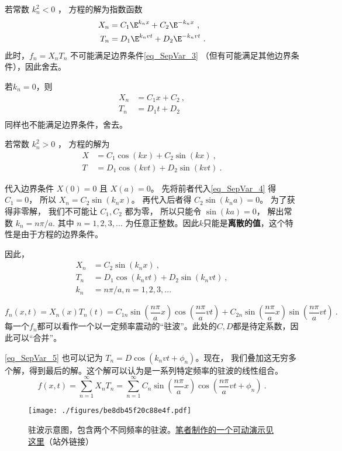 若常数 $k_n^2 < 0$ ， 方程的解为指数函数
\begin{align}
X_n &= C_1 \E^{k_nx} + C_2 \E^{-k_nx}~,\\
T_n &= D_1 \E^{k_nvt} + D_2 \E^{-k_nvt}~.
\end{align}
此时，$f_n = X_nT_n$ 不可能满足边界条件\autoref{eq_SepVar_3}  （但有可能满足其他边界条件），因此舍去。

若$k_n=0$，则
\begin{align}
X_n &= C_1x+C_2~,\\
T_n &= D_1t+D_2~\\
\end{align}
同样也不能满足边界条件，舍去。

若常数 $k_n^2 > 0$ ， 方程的解为
\begin{align}\label{eq_SepVar_4}
X &= C_1 \cos(kx) + C_2 \sin(kx)~,\\
T &= D_1 \cos(kvt) + D_2 \sin(kvt)~.
\end{align}

代入边界条件 $X(0) = 0$ 且 $X(a) = 0$。 先将前者代入\autoref{eq_SepVar_4} 得 $C_1 = 0$， 所以 $X_n = C_2\sin(k_nx)$。 再代入后者得 $C_2\sin(k_na) = 0$。 为了获得非零解， 我们不可能让 $C_1, C_2$ 都为零， 所以只能令 $\sin(ka) = 0$， 解出常数 $k_n = n\pi/a$. 其中 $n=1,2,3,...$ 为任意正整数。因此$k$只能是\textbf{离散的值}，这个特性是由于方程的边界条件。

因此，
\begin{align}
\label{eq_SepVar_5}X_n &= C_2 \sin(k_nx)~,\\
T_n &= D_1 \cos(k_nvt) + D_2 \sin(k_nvt)~,\\
k_n & = n\pi/a, n=1,2,3,...~
\end{align}

\begin{equation}
f_n(x, t) = X_n(x) T_n(t) = C_{1n} \sin(\frac{n\pi}{a}x)\cos(\frac{n\pi}{a} vt) + C_{2n}\sin(\frac{n\pi}{a}x)\sin(\frac{n\pi}{a}vt)~.
\end{equation}
每一个$f_n$都可以看作一个以一定频率震动的“驻波”。此处的$C, D$都是待定系数，因此可以“合并”。

\autoref{eq_SepVar_5} 也可以记为 $T_n=D\cos(k_nvt+\phi_n)$。现在， 我们叠加这无穷多个解，得到最后的解。这个解可以认为是一系列特定频率的驻波的线性组合。
\begin{equation}
f(x, t) = \sum_{n=1}^\infty X_nT_n = \sum_{n=1}^\infty C_n\sin(\frac{n\pi}{a}x)\cos(\frac{n\pi}{a}vt + \phi_n)~.
\end{equation}

\begin{figure}[ht]
\centering
\texttt{[image: ./figures/be8db45f20c88e4f.pdf]}
\caption{驻波示意图，包含两个不同频率的驻波。\href{https://www.geogebra.org/m/qc7nps6n}{笔者制作的一个可动演示见这里}（站外链接）} \label{fig_SepVar_1}
\end{figure}
